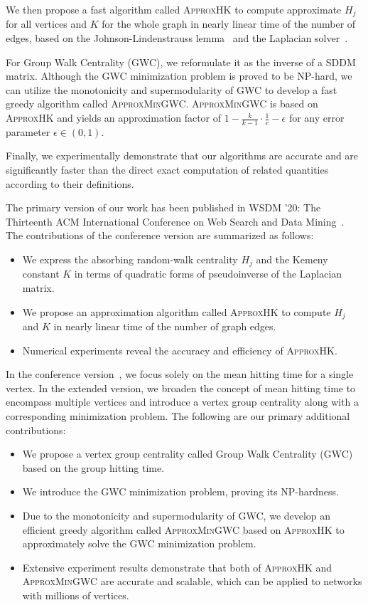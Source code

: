 \documentclass[10pt,twocolumn,twoside]{IEEEtran}
\begin{document}
We then propose a fast algorithm called \textsc{ApproxHK} to compute approximate \(H_j\) for all vertices and \(K\) for the whole graph in nearly linear time of the number of edges, based on the Johnson-Lindenstrauss lemma~\cite{Ac01} and the Laplacian solver~\cite{SpTe04,Sp10,KoMiPe11,LiBr12,CoKyMiPaPeRaSu14,KySa16,GaKySp23}.

For Group Walk Centrality (GWC), we reformulate it as the inverse of a SDDM matrix.
Although the GWC minimization problem is proved to be NP-hard, we can utilize the monotonicity and supermodularity of GWC to develop a fast greedy algorithm called \textsc{ApproxMinGWC}.
\textsc{ApproxMinGWC} is based on \textsc{ApproxHK} and yields an approximation factor of \(1-\frac{k}{k-1}\cdot\frac{1}{e}-\epsilon\) for any error parameter \(\epsilon\in(0,1)\).

Finally, we experimentally demonstrate that our algorithms are accurate and are significantly faster than the direct exact computation of related quantities according to their definitions.

The primary version of our work has been published in WSDM '20: The Thirteenth ACM International Conference on Web Search and Data Mining~\cite{ZhXuZh20}. The contributions of the conference version are summarized as follows:

\begin{itemize}
    \item We express the absorbing random-walk centrality \(H_j\) and the Kemeny constant \(K\) in terms of quadratic forms of pseudoinverse of the Laplacian matrix.
    \item We propose an approximation algorithm called \textsc{ApproxHK} to compute \(H_j\) and \(K\) in nearly linear time of the number of graph edges.
    \item Numerical experiments reveal the accuracy and efficiency of \textsc{ApproxHK}.
\end{itemize}

In the conference version~\cite{ZhXuZh20}, we focus solely on the mean hitting time for a single vertex.
In the extended version, we broaden the concept of mean hitting time to encompass multiple vertices and introduce a vertex group centrality along with a corresponding minimization problem.
The following are our primary additional contributions:

\begin{itemize}
    \item We propose a vertex group centrality called Group Walk Centrality (GWC) based on the group hitting time.
    \item We introduce the GWC minimization problem, proving its NP-hardness.
    \item Due to the monotonicity and supermodularity of GWC, we develop an efficient greedy algorithm called \textsc{ApproxMinGWC} based on \textsc{ApproxHK} to approximately solve the GWC minimization problem.
    \item Extensive experiment results demonstrate that both of \textsc{ApproxHK} and \textsc{ApproxMinGWC} are accurate and scalable, which can be applied to networks with millions of vertices.
\end{itemize}
\end{document}
